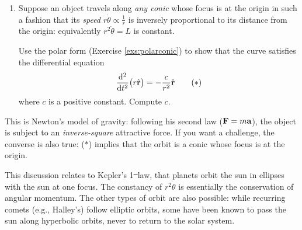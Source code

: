 \begin{exercises}{}{}
\begin{enumerate}[resume]
\begin{enumerate}
	    \item Suppose an object travels along \emph{any conic} whose focus is at the origin in such a fashion that its \emph{speed} $r\dot\theta\propto \frac 1r$ is inversely proportional to its distance from the origin: equivalently $r^2\dot\theta=L$ is constant.\par
	    Use the polar form (Exercise \ref{exs:polarconic}) to show that the curve satisfies the differential equation
	    \[
	    	\diff[^2]{t^2}\big(r\hvr\big) =-\frac c{r^2}\hvr \tag{$\ast$}
	    \]
	    where $c$ is a positive constant. Compute $c$.
	  \end{enumerate}
	  This is Newton's model of gravity: following his second law ($\vF=m\va$), the object is subject to an \emph{inverse-square} attractive force. If you want a challenge, the converse is also true: ($\ast$) implies that the orbit is a conic whose focus is at the origin.\par
	  This discussion relates to Kepler's 1\st\ law, that planets orbit the sun in ellipses with the sun at one focus. The constancy of $r^2\dot\theta$ is essentially the conservation of angular momentum. The other types of orbit are also possible: while recurring comets (e.g., Halley's) follow elliptic orbits, some have been known to pass the sun along hyperbolic orbits, never to return to the solar system.
	\end{enumerate}
\end{exercises}

